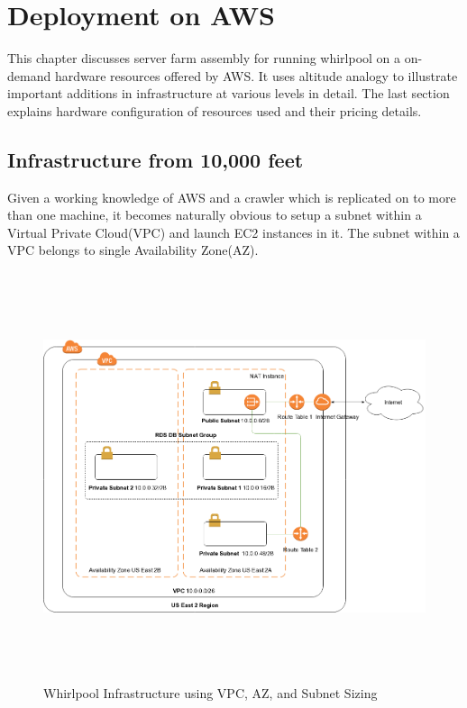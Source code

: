 \chapter{Deployment on AWS}
This chapter discusses server farm assembly for running whirlpool on a on-demand hardware resources offered by
AWS. It uses altitude analogy to illustrate important additions in infrastructure at various levels in
detail. The last section explains hardware configuration of resources used and their pricing details.

\section{Infrastructure from 10,000 feet}\label{infra10k}

Given a working knowledge of AWS and a crawler which is replicated on to more than one machine, it 
becomes naturally obvious to setup a subnet within a Virtual Private Cloud(VPC) and launch EC2 instances
in it. The subnet within a VPC belongs to single Availability Zone(AZ). 

\begin{figure}[h!]
  \centering
  \includegraphics[width=18cm,height=12cm,keepaspectratio]{../media/crawler/ten-thousand-feet-aws.png}
  \caption{Whirlpool Infrastructure using VPC, AZ, and Subnet Sizing}
  \label{fig:infra10k}
\end{figure}

